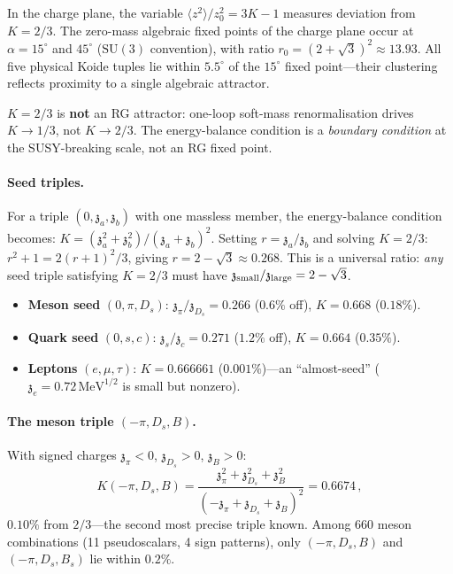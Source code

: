 \documentclass[aps,prd,twocolumn,showpacs,preprintnumbers,superscriptaddress,floatfix]{revtex4-2}
\newcommand{\SU}{\mathrm{SU}}
\newcommand{\MeV}{\,\mathrm{MeV}}
\newcommand{\zch}{\mathfrak{z}}
\begin{document}
In the charge plane, the variable
$\langle z^2\rangle/z_0^2 = 3K - 1$ measures deviation from
$K = 2/3$.
The zero-mass algebraic fixed points of the charge plane occur at
$\alpha = 15^\circ$ and $45^\circ$ ($\SU(3)$ convention), with
ratio $r_0 = (2+\sqrt{3})^2 \approx 13.93$.
All five physical Koide tuples lie within $5.5^\circ$ of the
$15^\circ$ fixed point---their clustering reflects proximity to
a single algebraic attractor.

$K = 2/3$ is \textbf{not} an RG attractor: one-loop soft-mass
renormalisation drives $K \to 1/3$, not $K \to 2/3$.
The energy-balance condition is a \emph{boundary condition} at
the SUSY-breaking scale, not an RG fixed point.

\paragraph{Seed triples.}
For a triple $(0, \zch_a, \zch_b)$ with one massless member,
the energy-balance condition becomes:
$K = (\zch_a^2 + \zch_b^2)/(\zch_a + \zch_b)^2$.
Setting $r = \zch_a/\zch_b$ and solving $K = 2/3$:
$r^2 + 1 = 2(r + 1)^2/3$, giving $r = 2 - \sqrt{3}
\approx 0.268$.
This is a universal ratio: \emph{any} seed triple satisfying
$K = 2/3$ must have $\zch_{\rm small}/\zch_{\rm large}
= 2 - \sqrt{3}$.
\begin{itemize}
  \item \textbf{Meson seed} $(0, \pi, D_s)$:
    $\zch_\pi/\zch_{D_s} = 0.266$ ($0.6\%$ off),
    $K = 0.668$ ($0.18\%$).
  \item \textbf{Quark seed} $(0, s, c)$:
    $\zch_s/\zch_c = 0.271$ ($1.2\%$ off),
    $K = 0.664$ ($0.35\%$).
  \item \textbf{Leptons} $(e, \mu, \tau)$:
    $K = 0.666661$ ($0.001\%$)---an ``almost-seed''
    ($\zch_e = 0.72\MeV^{1/2}$ is small but nonzero).
\end{itemize}

\paragraph{The meson triple $(-\pi, D_s, B)$.}
With signed charges $\zch_\pi < 0$, $\zch_{D_s} > 0$,
$\zch_B > 0$:
\begin{equation}
  K(-\pi, D_s, B) = \frac{\zch_\pi^2 + \zch_{D_s}^2 + \zch_B^2}
  {(-\zch_\pi + \zch_{D_s} + \zch_B)^2}
  = 0.6674\,,
\end{equation}
$0.10\%$ from $2/3$---the second most precise triple known.
Among 660 meson combinations (11 pseudoscalars, 4 sign patterns),
only $(-\pi, D_s, B)$ and $(-\pi, D_s, B_s)$ lie within $0.2\%$.
\end{document}
